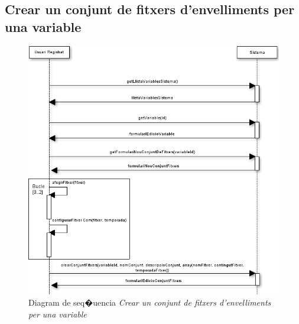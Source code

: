 \subsection*{Crear un conjunt de fitxers d'envelliments per una variable}
\begin{figure}[H]
  \centering
  \includegraphics[scale=0.6]{img/specification/SequenceNewSeasonSe.png}
  \caption{Diagram de seq�{u}encia \textit{Crear un conjunt de fitxers d'envelliments per una variable}}
  \label{fig:sequencenewseasonset}
\end{figure}

